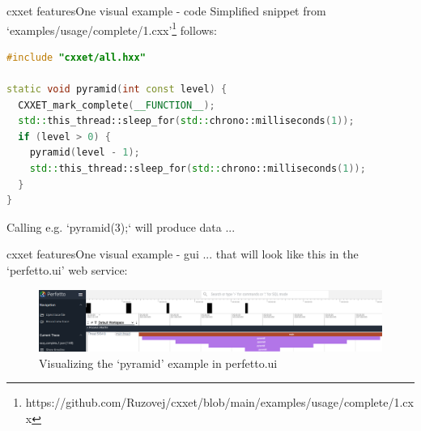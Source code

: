 \documentclass[aspectratio=169]{beamer}
\begin{document}
\begin{frame}[fragile]{cxxet features}{One visual example - code}
    Simplified snippet from `examples/usage/complete/1.cxx'\footnote{https://github.com/Ruzovej/cxxet/blob/main/examples/usage/complete/1.cxx} follows:

    \begin{lstlisting}[language=C++]
#include "cxxet/all.hxx"

static void pyramid(int const level) {
  CXXET_mark_complete(__FUNCTION__);
  std::this_thread::sleep_for(std::chrono::milliseconds(1));
  if (level > 0) {
    pyramid(level - 1);
    std::this_thread::sleep_for(std::chrono::milliseconds(1));
  }
}
    \end{lstlisting}

    Calling e.g. `pyramid(3);` will produce data ...

\end{frame}

\begin{frame}[fragile]{cxxet features}{One visual example - gui}
    ... that will look like this in the `perfetto.ui' web service:

    \begin{figure}[h]
        \centering
        \includegraphics[width=\textwidth,height=0.7\textheight,keepaspectratio]{pics/cxxet/pyramid.png}
        \caption{Visualizing the `pyramid' example in perfetto.ui}
    \end{figure}

\end{frame}
\end{document}
